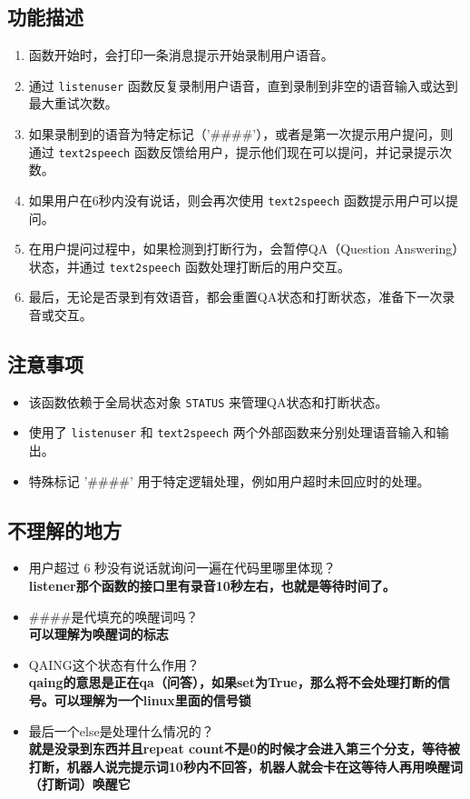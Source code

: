 \documentclass[]{article}
\begin{document}
\subsection{功能描述}
\begin{enumerate}
	\item 函数开始时，会打印一条消息提示开始录制用户语音。
	\item 通过 \texttt{listenuser} 函数反复录制用户语音，直到录制到非空的语音输入或达到最大重试次数。
	\item 如果录制到的语音为特定标记（'\#\#\#\#'），或者是第一次提示用户提问，则通过 \texttt{text2speech} 函数反馈给用户，提示他们现在可以提问，并记录提示次数。
	\item 如果用户在6秒内没有说话，则会再次使用 \texttt{text2speech} 函数提示用户可以提问。
	\item 在用户提问过程中，如果检测到打断行为，会暂停QA（Question Answering）状态，并通过 \texttt{text2speech} 函数处理打断后的用户交互。
	\item 最后，无论是否录到有效语音，都会重置QA状态和打断状态，准备下一次录音或交互。
\end{enumerate}

\subsection{注意事项}
\begin{itemize}
	\item 该函数依赖于全局状态对象 \texttt{STATUS} 来管理QA状态和打断状态。
	\item 使用了 \texttt{listenuser} 和 \texttt{text2speech} 两个外部函数来分别处理语音输入和输出。
	\item 特殊标记 '\#\#\#\#' 用于特定逻辑处理，例如用户超时未回应时的处理。
\end{itemize}
\subsection{不理解的地方}
\begin{itemize}
	\item 用户超过 6 秒没有说话就询问一遍在代码里哪里体现？\\
	\textbf{listener那个函数的接口里有录音10秒左右，也就是等待时间了。}
	\item \#\#\#\#是代填充的唤醒词吗？\\
	\textbf{可以理解为唤醒词的标志}
	\item QAING这个状态有什么作用？\\
\textbf{	qaing的意思是正在qa（问答），如果set为True，那么将不会处理打断的信号。可以理解为一个linux里面的信号锁}
	\item 最后一个else是处理什么情况的？\\
\textbf{	就是没录到东西并且repeat count不是0的时候才会进入第三个分支，等待被打断，机器人说完提示词10秒内不回答，机器人就会卡在这等待人再用唤醒词（打断词）唤醒它}
\end{itemize}
\end{document}

